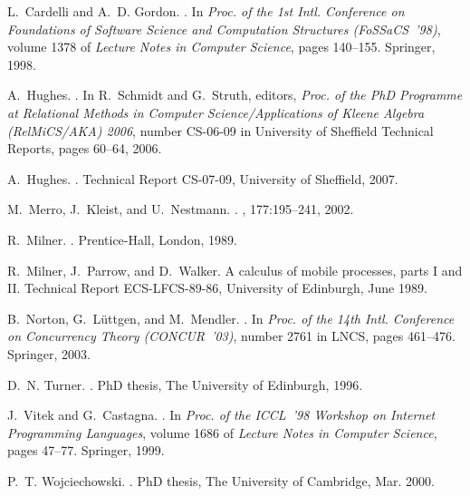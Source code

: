 \documentclass{sig-alternate}
\begin{document}

\begin{thebibliography}{10}

L.~Cardelli and A.~D. Gordon.
.
\newblock In {\em Proc. of the 1st Intl. Conference on Foundations of Software
  Science and Computation Structures ({FoSSaCS}~'98)}, volume 1378 of {\em
  Lecture Notes in Computer Science}, pages 140--155. Springer, 1998.

A.~Hughes.
.
\newblock In R.~Schmidt and G.~Struth, editors, {\em Proc. of the PhD Programme
  at Relational Methods in Computer Science/Applications of Kleene Algebra
  ({RelMiCS/AKA}) 2006}, number CS-06-09 in University of Sheffield Technical
  Reports, pages 60--64, 2006.

A.~Hughes.
.
\newblock Technical Report CS-07-09, University of Sheffield, 2007.

M.~Merro, J.~Kleist, and U.~Nestmann.
.
, 177:195--241, 2002.

R.~Milner.
.
\newblock Prentice-Hall, London, 1989.

R.~Milner, J.~Parrow, and D.~Walker.
\newblock A calculus of mobile processes, parts {I} and {II}.
\newblock Technical Report ECS-LFCS-89-86, University of Edinburgh, June 1989.

B.~Norton, G.~L{\"u}ttgen, and M.~Mendler.
.
\newblock In {\em Proc. of the 14th Intl. Conference on Concurrency Theory
  ({CONCUR}~'03)}, number 2761 in LNCS, pages 461--476. Springer, 2003.

D.~N. Turner.
.
\newblock PhD thesis, The University of Edinburgh, 1996.

J.~Vitek and G.~Castagna.
.
\newblock In {\em Proc. of the {ICCL}~'98 Workshop on Internet Programming
  Languages}, volume 1686 of {\em Lecture Notes in Computer Science}, pages
  47--77. Springer, 1999.

P.~T. Wojciechowski.
.
\newblock PhD thesis, The University of Cambridge, Mar. 2000.

\end{thebibliography}
\end{document}
